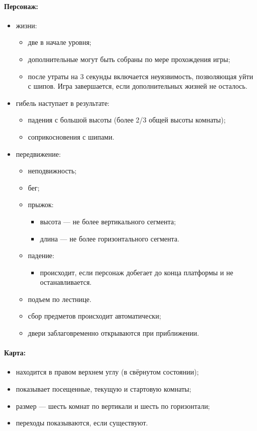 \documentclass[12pt,a4paper,fullpage,titlepage]{article}
\begin{document}
\paragraph{Персонаж:}
\begin{itemize}
	\item жизни:
	\begin{itemize}
		\item две в начале уровня;
		\item дополнительные могут быть собраны по мере прохождения игры;
		\item после утраты на 3 секунды включается неуязвимость, позволяющая уйти с шипов. Игра завершается, если дополнительных жизней не осталось.
	\end{itemize}
	\item гибель наступает в результате:
	\begin{itemize}
		\item падения с большой высоты (более 2/3 общей высоты комнаты);
		\item соприкосновения с шипами.
	\end{itemize}
	\item передвижение:
	\begin{itemize}
		\item неподвижность;
		\item бег;
		\item прыжок:
		\begin{itemize}
			\item высота --- не более вертикального сегмента;
			\item длина --- не более горизонтального сегмента.
		\end{itemize}
		\item падение:
		\begin{itemize}
			\item происходит, если персонаж добегает до конца платформы и не останавливается.
		\end{itemize}
		\item подъем по лестнице.
		\item сбор предметов происходит автоматически;
		\item двери заблаговременно открываются при приближении.
	\end{itemize}
\end{itemize}

\paragraph{Карта:}
\begin{itemize}
	\item находится в правом верхнем углу (в свёрнутом состоянии);
	\item показывает посещенные, текущую и стартовую комнаты;
	\item размер --- шесть комнат по вертикали и шесть по горизонтали;
	\item переходы показываются, если существуют.
\end{itemize}
\end{document}
